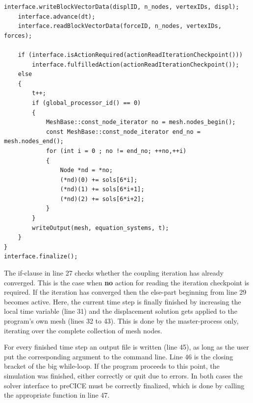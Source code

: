 \begin{lstlisting}[caption=preCICE main while-loop part 2,label=lst:preCICEint4b,keepspaces=true,name=while-loop]
	interface.writeBlockVectorData(displID, n_nodes, vertexIDs, displ);
	interface.advance(dt);
	interface.readBlockVectorData(forceID, n_nodes, vertexIDs, forces);

	if (interface.isActionRequired(actionReadIterationCheckpoint()))
		interface.fulfilledAction(actionReadIterationCheckpoint());
	else
	{
		t++;
		if (global_processor_id() == 0)
		{
			MeshBase::const_node_iterator no = mesh.nodes_begin();
			const MeshBase::const_node_iterator end_no = mesh.nodes_end();
			for (int i = 0 ; no != end_no; ++no,++i)
			{
				Node *nd = *no;
				(*nd)(0) += sols[6*i];
				(*nd)(1) += sols[6*i+1];
				(*nd)(2) += sols[6*i+2];
			}
		}
		writeOutput(mesh, equation_systems, t);
	}
}
interface.finalize();
\end{lstlisting}
   The if-clause in line 27 checks whether the coupling iteration has already converged. This is the case when \textbf{no} action for reading the iteration checkpoint is required. If the iteration has converged then the else-part beginning from line 29 becomes active. Here, the current time step is finally finished by increasing the local time variable (line 31) and the displacement solution gets applied to the program's own mesh (lines 32 to 43). This is done by the master-process only, iterating over the complete collection of mesh nodes.
   
   For every finished time step an output file is written (line 45), as long as the user put the corresponding argument to the command line. Line 46 is the closing bracket of the big while-loop. If the program proceeds to this point, the simulation was finished, either correctly or quit due to errors. In both cases the solver interface to preCICE must be correctly finalized, which is done by calling the appropriate function in line 47.
   
